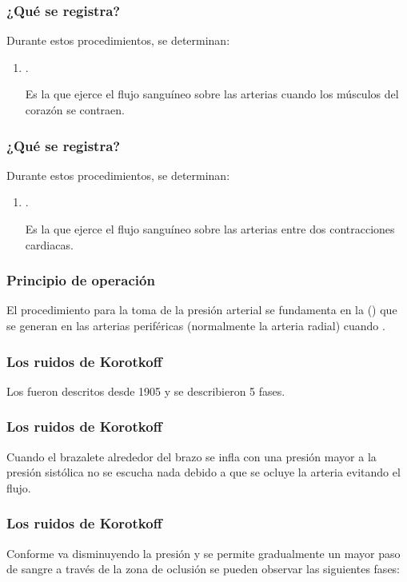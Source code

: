 \documentclass[14pt]{beamer}
\begin{document}
\begin{frame}
\frametitle{¿Qué se registra?}
Durante estos procedimientos, se determinan:
\pause
{}
\begin{enumerate}[<+->]
\item {}.

Es la que ejerce el flujo sanguíneo sobre las arterias cuando los músculos del corazón se contraen.
\seti
\end{enumerate}
\end{frame}
\begin{frame}
\frametitle{¿Qué se registra?}
Durante estos procedimientos, se determinan:
\pause
{}
\begin{enumerate}[<+->]
\conti
\item {}.

Es la que ejerce el flujo sanguíneo sobre las arterias entre dos contracciones cardiacas.
\end{enumerate}
\end{frame}
\begin{frame}
\frametitle{Principio de operación}
El procedimiento para la toma de la presión arterial se fundamenta en la  () \pause que se generan en las arterias periféricas (normalmente la arteria radial) cuando .
\end{frame}
\begin{frame}
\frametitle{Los ruidos de Korotkoff}
Los  fueron descritos desde 1905 y se describieron 5 fases.
\end{frame}
\begin{frame}
\frametitle{Los ruidos de Korotkoff}
Cuando el brazalete alrededor del brazo se infla con una presión mayor a la presión sistólica no se escucha nada debido a que se ocluye la arteria evitando el flujo.
\end{frame}
\begin{frame}
\frametitle{Los ruidos de Korotkoff}
Conforme va disminuyendo la presión y se permite gradualmente un mayor paso de sangre a través de la zona de oclusión se pueden observar las siguientes fases:
\end{frame}
\end{document}
